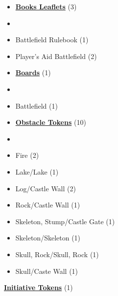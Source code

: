 
\begin{multicols}{3}

\footnotesize

\begin{itemize}[leftmargin=0pt, label={}, noitemsep]
  \item \textbf{\small{\underline{Books Leaflets}}} (3)
  \item
  \item Battlefield Rulebook (1)
  \item Player's Aid Battlefield (2)
\end{itemize}

\begin{itemize}[leftmargin=0pt, label={}, noitemsep]
  \item \textbf{\small{\underline{Boards}}} (1)
  \item
  \item Battlefield (1)
\end{itemize}

\begin{itemize}[leftmargin=0pt, label={}, noitemsep]
  \item \textbf{\small{\underline{Obstacle Tokens}}} (10)
  \item
  \item Fire (2)
  \item Lake/Lake (1)
  \item Log/Castle Wall (2)
  \item Rock/Castle Wall (1)
  \item Skeleton, Stump/Castle Gate (1)
  \item Skeleton/Skeleton (1)
  \item Skull, Rock/Skull, Rock (1)
  \item Skull/Caste Wall (1)
\end{itemize}

\textbf{\small{\underline{Initiative Tokens}}} (1)

\vspace*{\fill}
\columnbreak


\end{multicols}
